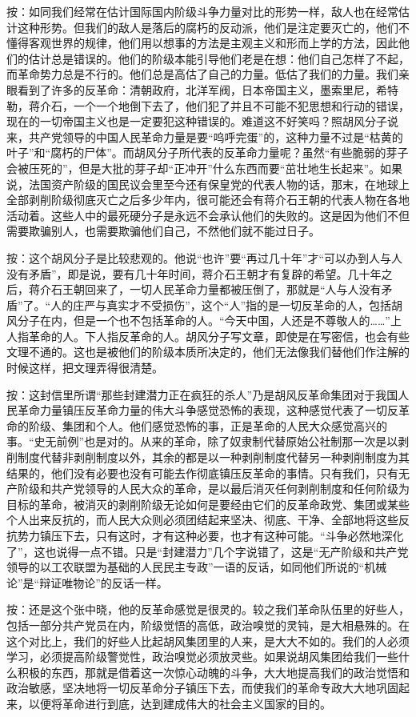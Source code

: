 按：如同我们经常在估计国际国内阶级斗争力量对比的形势一样，敌人也在经常估计这种形势。但我们的敌人是落后的腐朽的反动派，他们是注定要灭亡的，他们不懂得客观世界的规律，他们用以想事的方法是主观主义和形而上学的方法，因此他们的估计总是错误的。他们的阶级本能引导他们老是在想：他们自己怎样了不起，而革命势力总是不行的。他们总是高估了自己的力量。低估了我们的力量。我们亲眼看到了许多的反革命：清朝政府，北洋军阀，日本帝国主义，墨索里尼，希特勒，蒋介石，一个一个地倒下去了，他们犯了并且不可能不犯思想和行动的错误，现在的一切帝国主义也是一定要犯这种错误的。难道这不好笑吗？照胡风分子说来，共产党领导的中国人民革命力量是要“呜呼完蛋”的，这种力量不过是“枯黄的叶子”和“腐朽的尸体”。而胡风分子所代表的反革命力量呢？虽然“有些脆弱的芽子会被压死的”，但是大批的芽子却“正冲开”什么东西而要“茁壮地生长起来”。如果说，法国资产阶级的国民议会里至今还有保皇党的代表人物的话，那末，在地球上全部剥削阶级彻底灭亡之后多少年内，很可能还会有蒋介石王朝的代表人物在各地活动着。这些人中的最死硬分子是永远不会承认他们的失败的。这是因为他们不但需要欺骗别人，也需要欺骗他们自己，不然他们就不能过日子。

按：这个胡风分子是比较悲观的。他说“也许”要“再过几十年”才“可以办到人与人没有矛盾”，即是说，要有几十年时间，蒋介石王朝才有复辟的希望。几十年之后，蒋介石王朝回来了，一切人民革命力量都被压倒了，那就是“人与人没有矛盾”了。“人的庄严与真实才不受损伤”，这个“人”指的是一切反革命的人，包括胡风分子在内，但是一个也不包括革命的人。“今天中国，人还是不尊敬人的……”上人指革命的人。下人指反革命的人。胡风分子写文章，即使是在写密信，也会有些文理不通的。这也是被他们的阶级本质所决定的，他们无法像我们替他们作注解的时候这样，把文理弄得很清楚。

按：这封信里所谓“那些封建潜力正在疯狂的杀人”乃是胡风反革命集团对于我国人民革命力量镇压反革命力量的伟大斗争感觉恐怖的表现，这种感觉代表了一切反革命的阶级、集团和个人。他们感觉恐怖的事，正是革命的人民大众感觉高兴的事。“史无前例”也是对的。从来的革命，除了奴隶制代替原始公社制那一次是以剥削制度代替非剥削制度以外，其余的都是以一种剥削制度代替另一种剥削制度为其结果的，他们没有必要也没有可能去作彻底镇压反革命的事情。只有我们，只有无产阶级和共产党领导的人民大众的革命，是以最后消灭任何剥削制度和任何阶级为目标的革命，被消灭的剥削阶级无论如何是要经由它们的反革命政党、集团或某些个人出来反抗的，而人民大众则必须团结起来坚决、彻底、干净、全部地将这些反抗势力镇压下去，只有这时，才有这种必要，也才有这种可能。“斗争必然地深化了”，这也说得一点不错。只是“封建潜力”几个字说错了，这是“无产阶级和共产党领导的以工农联盟为基础的人民民主专政”一语的反话，如同他们所说的“机械论”是“辩证唯物论”的反话一样。

按：还是这个张中晓，他的反革命感觉是很灵的。较之我们革命队伍里的好些人，包括一部分共产党员在内，阶级觉悟的高低，政治嗅觉的灵钝，是大相悬殊的。在这个对比上，我们的好些人比起胡风集团里的人来，是大大不如的。我们的人必须学习，必须提高阶级警觉性，政治嗅觉必须放灵些。如果说胡风集团给我们一些什么积极的东西，那就是借着这一次惊心动魄的斗争，大大地提高我们的政治觉悟和政治敏感，坚决地将一切反革命分子镇压下去，而使我们的革命专政大大地巩固起来，以便将革命进行到底，达到建成伟大的社会主义国家的目的。


